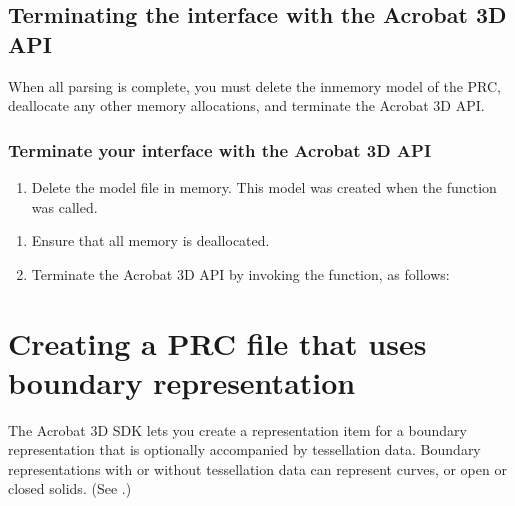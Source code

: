 \documentclass[letterpaper,12pt,english,openany,oneside]{sphinxmanual}
\begin{document}
\subsection{Terminating the interface with the Acrobat 3D API}
\label{\detokenize{Plugins_A3D_API:terminating-the-interface-with-the-acrobat-3d-api}}
When all parsing is complete, you must delete the in\sphinxhyphen{}memory model of the PRC, de\sphinxhyphen{}allocate any other memory allocations, and terminate the Acrobat 3D API.


\subsubsection{Terminate your interface with the Acrobat 3D API}
\label{\detokenize{Plugins_A3D_API:terminate-your-interface-with-the-acrobat-3d-api}}\begin{enumerate}
%
\item {} 
Delete the model file in memory. This model was created when the  function was called.

\end{enumerate}

\begin{sphinxVerbatim}[commandchars=\\\{\}]
\end{sphinxVerbatim}
\begin{enumerate}
%
\item {} 
Ensure that all memory is de\sphinxhyphen{}allocated.

\item {} 
Terminate the Acrobat 3D API by invoking the  function, as follows:

\end{enumerate}

\begin{sphinxVerbatim}[commandchars=\\\{\}]
\end{sphinxVerbatim}


\section{Creating a PRC file that uses boundary representation}
\label{\detokenize{Plugins_A3D_API:creating-a-prc-file-that-uses-boundary-representation}}
The Acrobat 3D SDK lets you create a representation item for a boundary representation that is optionally accompanied by tessellation data. Boundary representations with or without tessellation data can represent curves, or open or closed solids. (See .)
\end{document}
